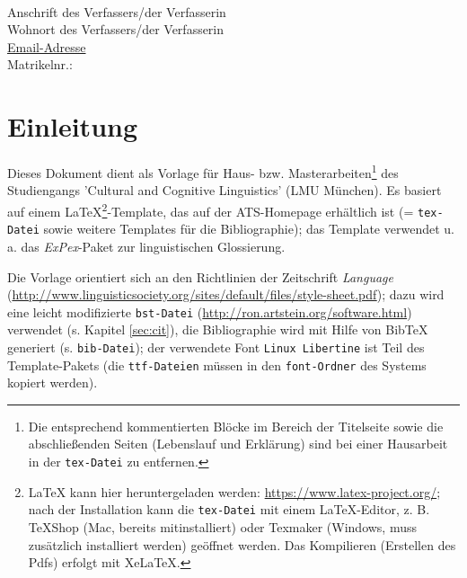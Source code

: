 \documentclass[12pt,letterpaper]{article} %
\begin{document}
\vspace{1,5cm}

\begin{center}
\begin{large}
\author{Name des Verfassers/der Verfasserin}\\
\end{large}
Anschrift des Verfassers/der Verfasserin\\ 
Wohnort des Verfassers/der Verfasserin\\ 
\url{Email-Adresse}\\
Matrikelnr.:  \\
\end{center}



\newpage
\setcounter{page}{1}
\tableofcontents
\newpage


\pagestyle{fancy}
\fancyhf{}
\fancyhead[R]{\thepage}
\renewcommand{\headrulewidth}{0pt} %

\section{Einleitung}
Dieses Dokument dient als Vorlage für Haus- bzw. Masterarbeiten\footnote{Die entsprechend kommentierten Blöcke im Bereich der Titelseite sowie die abschließenden Seiten (Lebenslauf und Erklärung) sind bei einer Hausarbeit in der \texttt{tex-Datei} zu entfernen.} des Studiengangs 'Cultural and Cognitive Linguistics' (LMU München). Es basiert auf einem LaTeX\footnote{LaTeX kann hier heruntergeladen werden: \url{https://www.latex-project.org/}; nach der Installation kann die \texttt{tex-Datei} mit einem LaTeX-Editor, z. B. TeXShop (Mac, bereits mitinstalliert) oder Texmaker (Windows, muss zusätzlich installiert werden) geöffnet werden. Das Kompilieren (Erstellen des Pdfs) erfolgt mit XeLaTeX.}-Template, das auf der ATS-Homepage erhältlich ist (= \verb+tex-Datei+ sowie weitere Templates für die Bibliographie); das Template verwendet u. a. das \emph{ExPex}-Paket zur linguistischen Glossierung.

Die Vorlage orientiert sich an den Richtlinien der Zeitschrift \emph{Language} (\url{http://www.linguisticsociety.org/sites/default/files/style-sheet.pdf}); dazu wird eine leicht modifizierte \verb+bst-Datei+ (\url{http://ron.artstein.org/software.html}) verwendet (s. Kapitel \ref{sec:cit}), die Bibliographie wird mit Hilfe von BibTeX generiert (s. \verb+bib-Datei+); der verwendete Font \verb+Linux Libertine+ ist Teil des Template-Pakets (die \verb+ttf-Dateien+ müssen in den \verb+font-Ordner+ des Systems kopiert werden).
\end{document}
